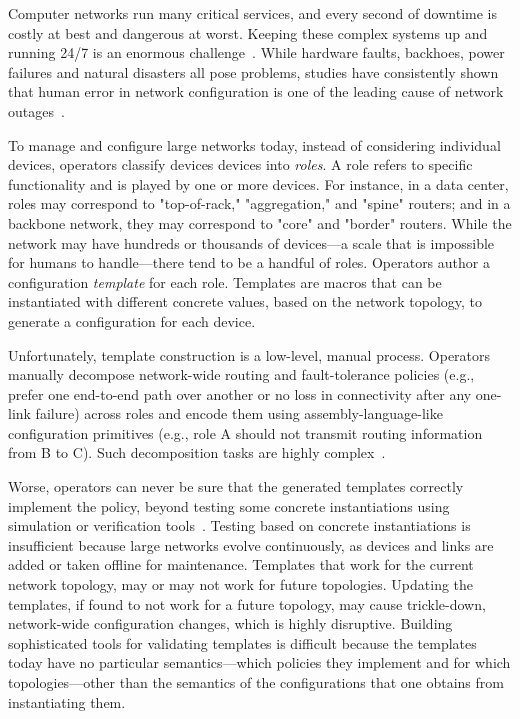 \documentclass[numbers, 10pt, preprint]{sigplanconf}
\begin{document}


Computer networks run many critical services, and every second of downtime is
costly at best and dangerous at worst.  Keeping these complex systems up and
running 24/7 is an enormous
challenge~\cite{mahajan+:bgp-misconfiguration,feamster+:rcc,batfish,dc-failure-study}.
%
While hardware faults, backhoes, power failures and natural disasters all pose
problems, studies have consistently shown that human error in network
configuration is one of the leading cause of network
outages~\cite{juniper-study,xx}.

To manage and configure large networks today, instead of considering individual
devices, operators classify devices devices into {\em roles}. A role refers to
specific functionality and is played by one or more devices. For instance, in a
data center, roles may correspond to "top-of-rack," "aggregation," and "spine"
routers; and in a backbone network, they may correspond to "core" and "border"
routers. While the network may have hundreds or thousands of devices---a scale
that is impossible for humans to handle---there tend to be a handful of roles.
%
Operators author a configuration {\em template} for each role. Templates are
macros that can be instantiated with different concrete values, based on the
network topology, to generate a configuration for each device.

Unfortunately, template construction is a low-level, manual process. Operators
manually decompose network-wide routing and fault-tolerance policies (e.g.,
prefer one end-to-end path over another or no loss in connectivity after any
one-link failure) across roles and encode them using assembly-language-like
configuration primitives (e.g., role A should not transmit routing information
from B to C). Such decomposition tasks are highly complex~\cite{propane}.

Worse, operators can never be sure that the generated templates correctly
implement the policy,  beyond testing some concrete instantiations using
simulation or verification tools~\cite{x,y}. Testing based on concrete
instantiations is insufficient because large networks evolve continuously, as
devices and links are added or taken offline for maintenance. Templates that
work for the current network topology, may or may not work for future
topologies. Updating the templates, if found to not work for a future topology,
may cause trickle-down, network-wide configuration changes, which is highly
disruptive. Building sophisticated tools for validating templates is difficult
because the templates today have no particular semantics---which policies they
implement and for which topologies---other than the semantics of the
configurations that one obtains from instantiating them.
\end{document}
